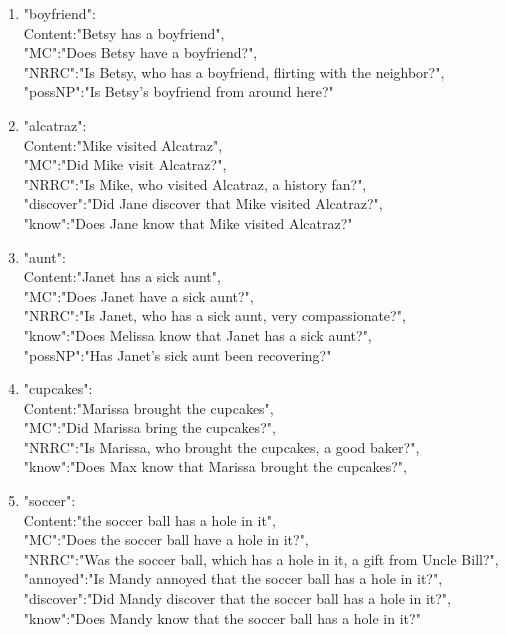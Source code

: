 \documentclass[11pt,fleqn]{article}
\newcommand{\6}{\mbox{$[\hspace*{-.6mm}[$}}
\newcommand{\9}{\mbox{$]\hspace*{-.6mm}]$}}
\begin{document}
\begin{enumerate}
\item "boyfriend": \\
     Content:"Betsy has a boyfriend",\\
     "MC":"Does Betsy have a boyfriend?",\\
     "NRRC":"Is Betsy, who has a boyfriend, flirting with the neighbor?",\\
     "possNP":"Is Betsy's boyfriend from around here?"

\item "alcatraz": \\
     Content:"Mike visited Alcatraz",\\
     "MC":"Did Mike visit Alcatraz?",\\
     "NRRC":"Is Mike, who visited Alcatraz, a history fan?",\\
     "discover":"Did Jane discover that Mike visited Alcatraz?",\\
     "know":"Does Jane know that Mike visited Alcatraz?"

\item "aunt": \\
     Content:"Janet has a sick aunt",\\
     "MC":"Does Janet have a sick aunt?",\\
     "NRRC":"Is Janet, who has a sick aunt, very compassionate?",\\
     "know":"Does Melissa know that Janet has a sick aunt?",\\
     "possNP":"Has Janet's sick aunt been recovering?"

\item "cupcakes": \\
     Content:"Marissa brought the cupcakes",\\
     "MC":"Did Marissa bring the cupcakes?",\\
     "NRRC":"Is Marissa, who brought the cupcakes, a good baker?",\\
     "know":"Does Max know that Marissa brought the cupcakes?",\\

\item "soccer": \\
     Content:"the soccer ball has a hole in it",\\
     "MC":"Does the soccer ball have a hole in it?",\\
     "NRRC":"Was the soccer ball, which has a hole in it, a gift from Uncle Bill?",\\
     "annoyed":"Is Mandy annoyed that the soccer ball has a hole in it?",\\
     "discover":"Did Mandy discover that the soccer ball has a hole in it?",\\
     "know":"Does Mandy know that the soccer ball has a hole in it?"


\end{enumerate}
\end{document}
